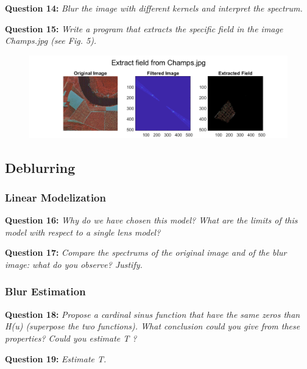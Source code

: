 \textbf{Question 14:}
\textit{Blur the image with diﬀerent kernels and interpret the spectrum.}



\textbf{Question 15:}
\textit{Write a program that extracts the speciﬁc ﬁeld in the image Champs.jpg (see Fig. 5).}

\begin{figure}[H]
    \centering
    \includegraphics[width=\linewidth]{Doc/Graphics/Part1/Part1_Question15.png}
    \label{fig:enter-label}
\end{figure}


\subsection{Deblurring}
\subsubsection{Linear Modelization}
\textbf{Question 16:}
\textit{Why do we have chosen this model? What are the limits of this model with respect to a single lens model?}

\TODO{}

\textbf{Question 17:}
\textit{Compare the spectrums of the original image and of the blur image: what do you observe? Justify.}

\TODO{}

\subsubsection{Blur Estimation}
\textbf{Question 18:}
\textit{Propose a cardinal sinus function that have the same zeros than H(u) (superpose the two functions). What conclusion could you give from these properties? Could you estimate T ?}

\TODO{}

\textbf{Question 19:}
\textit{Estimate T.}


